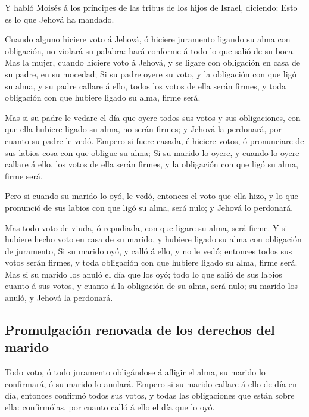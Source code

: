  Y habló Moisés á los príncipes de las tribus de los hijos
de Israel, diciendo: Esto es lo que Jehová ha mandado.

 Cuando alguno hiciere voto á Jehová, ó hiciere juramento
ligando su alma con obligación, no violará su palabra: hará conforme á
todo lo que salió de su boca.  Mas la mujer, cuando hiciere
voto á Jehová, y se ligare con obligación en casa de su padre, en su
mocedad;  Si su padre oyere su voto, y la obligación con que
ligó su alma, y su padre callare á ello, todos los votos de ella serán
firmes, y toda obligación con que hubiere ligado su alma, firme será.

 Mas si su padre le vedare el día que oyere todos sus votos
y sus obligaciones, con que ella hubiere ligado su alma, no serán
firmes; y Jehová la perdonará, por cuanto su padre le vedó. 
Empero si fuere casada, é hiciere votos, ó pronunciare de sus labios
cosa con que obligue su alma;  Si su marido lo oyere, y
cuando lo oyere callare á ello, los votos de ella serán firmes, y la
obligación con que ligó su alma, firme será.

 Pero si cuando su marido lo oyó, le vedó, entonces el voto
que ella hizo, y lo que pronunció de sus labios con que ligó su alma,
será nulo; y Jehová lo perdonará.

 Mas todo voto de viuda, ó repudiada, con que ligare su
alma, será firme.  Y si hubiere hecho voto en casa de su
marido, y hubiere ligado su alma con obligación de juramento,
 Si su marido oyó, y calló á ello, y no le vedó; entonces
todos sus votos serán firmes, y toda obligación con que hubiere ligado
su alma, firme será.  Mas si su marido los anuló el día que
los oyó; todo lo que salió de sus labios cuanto á sus votos, y cuanto á
la obligación de su alma, será nulo; su marido los anuló, y Jehová la
perdonará.

\hypertarget{promulgaciuxf3n-renovada-de-los-derechos-del-marido}{%
\subsection{Promulgación renovada de los derechos del
marido}\label{promulgaciuxf3n-renovada-de-los-derechos-del-marido}}

 Todo voto, ó todo juramento obligándose á afligir el alma,
su marido lo confirmará, ó su marido lo anulará.  Empero si
su marido callare á ello de día en día, entonces confirmó todos sus
votos, y todas las obligaciones que están sobre ella: confirmólas, por
cuanto calló á ello el día que lo oyó.

